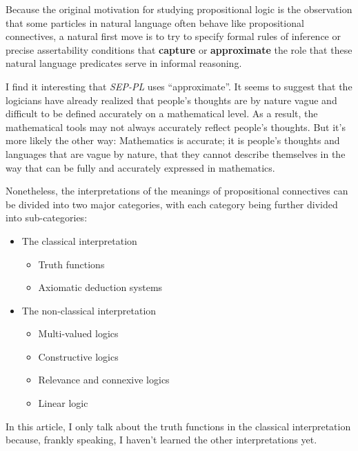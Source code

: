 \documentclass[12pt, letterpaper]{article}
\begin{document}
\begin{displayquote}
  Because the original motivation for studying propositional logic is the
  observation that some particles in natural language often behave like
  propositional connectives, a natural first move is to try to specify formal
  rules of inference or precise assertability conditions that \textbf{capture}
  or \textbf{approximate} the role that these natural language predicates serve
  in informal reasoning.
\end{displayquote}

I find it interesting that \textit{SEP-PL} uses ``approximate''. It seems to
suggest that the logicians have already realized that people's thoughts are
by nature vague and difficult to be defined accurately on a mathematical level.
As a result, the mathematical tools may not always accurately reflect people's
thoughts. But it's more likely the other way: Mathematics is accurate; it is
people's thoughts and languages that are vague by nature, that they cannot
describe themselves in the way that can be fully and accurately expressed in
mathematics.

Nonetheless, the interpretations of the meanings of propositional connectives
can be divided into two major categories, with each category being further
divided into sub-categories:
\begin{itemize}
  \item The classical interpretation
        \begin{itemize}
          \item Truth functions
          \item Axiomatic deduction systems
        \end{itemize}
  \item The non-classical interpretation
        \begin{itemize}
          \item Multi-valued logics
          \item Constructive logics
          \item Relevance and connexive logics
          \item Linear logic
        \end{itemize}
\end{itemize}

In this article, I only talk about the truth functions in the classical
interpretation because, frankly speaking, I haven't learned the other
interpretations yet.

\end{document}
